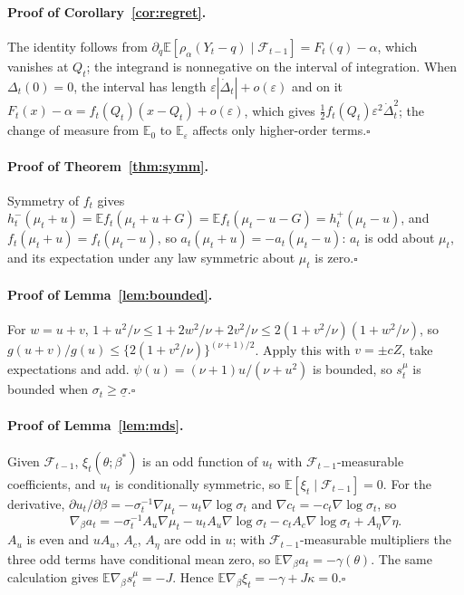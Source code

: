 \documentclass[11pt,a4paper]{article}
\theoremstyle{definition}
\theoremstyle{remark}
\newcommand{\E}{\mathbb{E}}
\newcommand{\F}{\mathcal{F}}
\begin{document}
\paragraph{Proof of Corollary~\ref{cor:regret}.}
The identity follows from $\partial_q\E[\rho_\alpha(Y_t-q)\mid\F_{t-1}]=F_t(q)-\alpha$, which vanishes at $Q_t$; the integrand is nonnegative on the interval of integration. When $\Delta_t(0)=0$, the interval has length $\varepsilon|\dot\Delta_t|+o(\varepsilon)$ and on it $F_t(x)-\alpha=f_t(Q_t)(x-Q_t)+o(\varepsilon)$, which gives $\tfrac12f_t(Q_t)\varepsilon^2\dot\Delta_t^2$; the change of measure from $\E_0$ to $\E_\varepsilon$ affects only higher-order terms.\hfill$\square$

\paragraph{Proof of Theorem~\ref{thm:symm}.}
Symmetry of $f_t$ gives $h^-_t(\mu_t+u)=\E f_t(\mu_t+u+G)=\E f_t(\mu_t-u-G)=h^+_t(\mu_t-u)$, and $f_t(\mu_t+u)=f_t(\mu_t-u)$, so $a_t(\mu_t+u)=-a_t(\mu_t-u)$: $a_t$ is odd about $\mu_t$, and its expectation under any law symmetric about $\mu_t$ is zero.\hfill$\square$

\paragraph{Proof of Lemma~\ref{lem:bounded}.}
For $w=u+v$, $1+u^2/\nu\le1+2w^2/\nu+2v^2/\nu\le2(1+v^2/\nu)(1+w^2/\nu)$, so $g(u+v)/g(u)\le\{2(1+v^2/\nu)\}^{(\nu+1)/2}$. Apply this with $v=\pm cZ$, take expectations and add. $\psi(u)=(\nu+1)u/(\nu+u^2)$ is bounded, so $s^\mu_t$ is bounded when $\sigma_t\ge\underline\sigma$.\hfill$\square$

\paragraph{Proof of Lemma~\ref{lem:mds}.}
Given $\F_{t-1}$, $\xi_t(\theta;\beta^*)$ is an odd function of $u_t$ with $\F_{t-1}$-measurable coefficients, and $u_t$ is conditionally symmetric, so $\E[\xi_t\mid\F_{t-1}]=0$. For the derivative, $\partial u_t/\partial\beta=-\sigma_t^{-1}\nabla\mu_t-u_t\nabla\log\sigma_t$ and $\nabla c_t=-c_t\nabla\log\sigma_t$, so
\[
\nabla_\beta a_t=-\sigma_t^{-1}A_u\nabla\mu_t-u_tA_u\nabla\log\sigma_t-c_tA_c\nabla\log\sigma_t+A_\eta\nabla\eta .
\]
$A_u$ is even and $uA_u$, $A_c$, $A_\eta$ are odd in $u$; with $\F_{t-1}$-measurable multipliers the three odd terms have conditional mean zero, so $\E\nabla_\beta a_t=-\gamma(\theta)$. The same calculation gives $\E\nabla_\beta s^\mu_t=-J$. Hence $\E\nabla_\beta\xi_t=-\gamma+J\kappa=0$.\hfill$\square$
\end{document}
